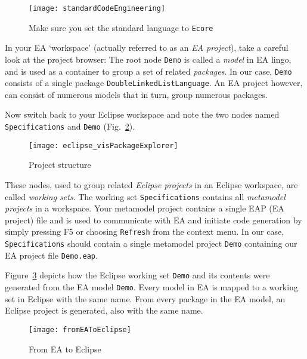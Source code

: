 \begin{figure}[htbp]
    \centering
    \texttt{[image: standardCodeEngineering]}
    \caption{Make sure you set the standard language to \texttt{Ecore}}
    \label{ea:standardSCEEA}
 \end{figure}
 
\clearpage

In your EA `workspace' (actually referred to as an \emph{EA project}), take a careful  look at the project browser:  The root node \texttt{Demo} is called a
\emph{model} in EA lingo, and is used as a container to group a set of related \emph{packages}. In our case, \texttt{Demo}  consists of a single package
\texttt{DoubleLinkedListLanguage}. An EA project however, can consist of numerous models that in turn, group numerous packages.

Now switch back to your Eclipse workspace and note the two nodes named \texttt{Spe\-ci\-fi\-ca\-tions} and \texttt{Demo} (Fig.~\ref{eclipse:eclipsePS}).

\begin{figure}[htbp]
    \centering
    \texttt{[image: eclipse\_visPackageExplorer]}
    \caption{Project structure}
    \label{eclipse:eclipsePS}
 \end{figure}

These nodes, used to group related \emph{Eclipse projects} in an Eclipse workspace, are called \emph{working sets}. The working set
\texttt{Spe\-ci\-fi\-ca\-tions} contains all \emph{metamodel projects} in a  workspace. Your metamodel project contains a single EAP (EA project) file and is
used to communicate with EA and initiate code generation by simply pressing F5 or choosing \texttt{Refresh} from the context menu. In our case,
\texttt{Specifications} should contain a single metamodel project \texttt{Demo} containing our EA project file  \texttt{Demo.eap}.
 
Figure~\ref{fig:fromEAtoEclipse} depicts how the Eclipse working set \texttt{Demo} and its contents were generated from the EA model \texttt{Demo}. Every model
in EA is mapped to a working set in Eclipse with the same name. From every package in the EA model, an Eclipse project is generated, also with the same name.

\begin{figure}[htbp]
    \centering
  \texttt{[image: fromEAToEclipse]}
    \caption{From EA to Eclipse}
    \label{fig:fromEAtoEclipse}
\end{figure}

